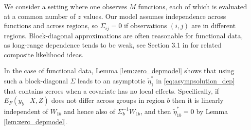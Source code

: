  We consider a setting where one observes $M$ functions, each of which is evaluated at a common number of $z$ values.
Our model assumes independence across functions and across regions, so $\Sigma_{ij}=0$ if observations $(i,j)$ are in different regions. 
Block-diagonal approximations are often reasonable for functional data, as long-range dependence tends to be weak,
see Section 3.1 in \cite{varin:2011}  for related composite likelihood ideas.

In the case of functional data, %
Lemma \ref{lem:zero_depmodel} shows that using such a block-diagonal $\Sigma$ leads to an asymptotic $\tilde{\eta}_1^*$ in \eqref{eq:asympsolution_dep} that contains zeroes when a covariate has no local effects. %
Specifically, if $E_F(y_b \mid X,Z)$ does not differ across groups in region $b$ then it is linearly independent of $W_{1b}$ and hence also of $\Sigma_b^{-1} W_{1b}$,
and then  $\tilde{\eta}_{1b}^*=0$ by Lemma \ref{lem:zero_depmodel}.

